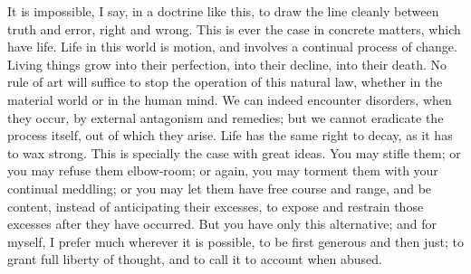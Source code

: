 It is impossible, I say, in a doctrine like this, to draw the
line cleanly between truth and error, right and wrong. This is ever the
case in concrete matters, which have life. Life in this world is motion,
and involves a continual process of change. Living things grow into
their perfection, into their decline, into their death. No rule of art
will suffice to stop the operation of this natural law, whether in the
material world or in the human mind. We can indeed encounter disorders,
when they occur, by external antagonism and remedies; but we cannot
eradicate the process itself, out of which they arise. Life has the same
right to decay, as it has to wax strong. This is specially the case with
great ideas. You may stifle them; or you may refuse them elbow-room; or
again, you may torment them with your continual meddling; or you may let
them have free course and range, and be content, instead of anticipating
their excesses, to expose and restrain those excesses after they have
occurred. But you have only this alternative; and for myself, I prefer
much wherever it is possible, to be first generous and then just; to
grant full liberty of thought, and to call it to account when abused.

